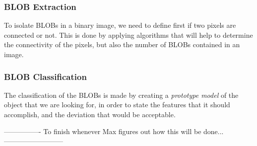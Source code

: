 \subsubsection{BLOB Extraction}
To isolate BLOBs in a binary image, we need to define first if two pixels are connected or not. This is done by applying algorithms that will help to determine the connectivity of the pixels, but also the number of BLOBs contained in an image.

\subsubsection{BLOB Classification}
The classification of the BLOBs is made by creating a \textit{prototype model} of the object that we are looking for, in order to state the features that it should accomplish, and the deviation that would be acceptable.

---------------- To finish whenever Max figures out how this will be done... --------------------------
